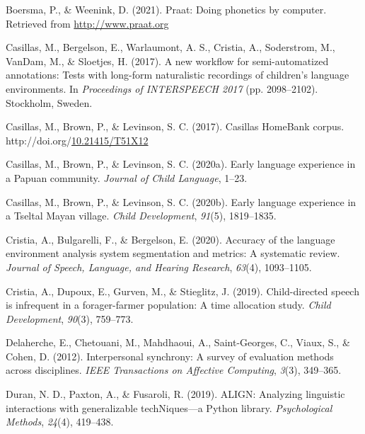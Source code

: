 \documentclass[10pt, letterpaper]{article}
\newenvironment{CSLReferences}%
  {}%
  {\par}
\begin{document}
\setlength{\parindent}{-0.1in} 
\setlength{\leftskip}{0.125in}

\noindent

\hypertarget{refs}{}
\begin{CSLReferences}{1}{0}
\leavevmode\hypertarget{ref-PRAAT}{}%
Boersma, P., \& Weenink, D. (2021). Praat: Doing phonetics by computer.
Retrieved from \url{http://www.praat.org}

\leavevmode\hypertarget{ref-casillas2017workflow}{}%
Casillas, M., Bergelson, E., Warlaumont, A. S., Cristia, A., Soderstrom,
M., VanDam, M., \& Sloetjes, H. (2017). A new workflow for
semi-automatized annotations: Tests with long-form naturalistic
recordings of children's language environments. In \emph{Proceedings of
{INTERSPEECH} 2017} (pp. 2098--2102). Stockholm, Sweden.

\leavevmode\hypertarget{ref-Casillas-HB}{}%
Casillas, M., Brown, P., \& Levinson, S. C. (2017). Casillas {HomeBank}
corpus.
http://doi.org/\href{https://doi.org/10.21415/T51X12}{10.21415/T51X12}

\leavevmode\hypertarget{ref-casillas2020rossel}{}%
Casillas, M., Brown, P., \& Levinson, S. C. (2020a). Early language
experience in a {P}apuan community. \emph{Journal of Child Language},
1--23.

\leavevmode\hypertarget{ref-casillas2020tseltal}{}%
Casillas, M., Brown, P., \& Levinson, S. C. (2020b). Early language
experience in a {Tseltal Mayan} village. \emph{Child Development},
\emph{91}(5), 1819--1835.

\leavevmode\hypertarget{ref-cristia2020accuracy}{}%
Cristia, A., Bulgarelli, F., \& Bergelson, E. (2020). Accuracy of the
language environment analysis system segmentation and metrics: A
systematic review. \emph{Journal of Speech, Language, and Hearing
Research}, \emph{63}(4), 1093--1105.

\leavevmode\hypertarget{ref-cristia2019child}{}%
Cristia, A., Dupoux, E., Gurven, M., \& Stieglitz, J. (2019).
Child-directed speech is infrequent in a forager-farmer population: A
time allocation study. \emph{Child Development}, \emph{90}(3), 759--773.

\leavevmode\hypertarget{ref-delaherche2012interpersonal}{}%
Delaherche, E., Chetouani, M., Mahdhaoui, A., Saint-Georges, C., Viaux,
S., \& Cohen, D. (2012). Interpersonal synchrony: A survey of evaluation
methods across disciplines. \emph{IEEE Transactions on Affective
Computing}, \emph{3}(3), 349--365.

\leavevmode\hypertarget{ref-duran2019align}{}%
Duran, N. D., Paxton, A., \& Fusaroli, R. (2019). ALIGN: Analyzing
linguistic interactions with generalizable techNiques---a {P}ython
library. \emph{Psychological Methods}, \emph{24}(4), 419--438.


\end{CSLReferences}
\end{document}
